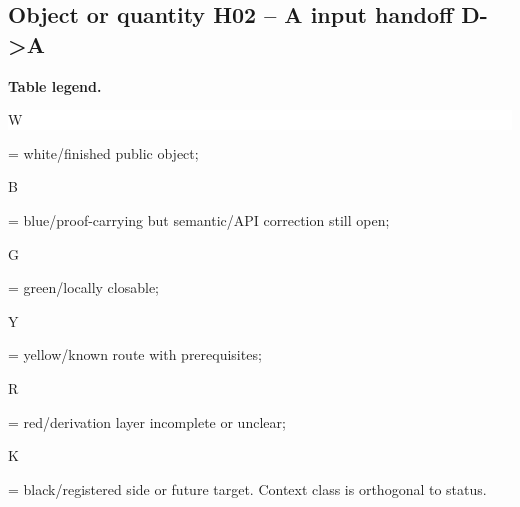 \subsection*{Object or quantity H02 -- A input handoff D->A}
\hypertarget{objproof:H02}{}
\par\smallskip\noindent\begin{minipage}{0.99\linewidth}\footnotesize\raggedright\textbf{Table legend.} \colorbox{white}{\strut W} = white/finished public object; \colorbox{cyan!20}{\strut B} = blue/proof-carrying but semantic/API correction still open; \colorbox{green!18}{\strut G} = green/locally closable; \colorbox{yellow!25}{\strut Y} = yellow/known route with prerequisites; \colorbox{red!20}{\strut R} = red/derivation layer incomplete or unclear; \colorbox{black!18}{\strut K} = black/registered side or future target. Context class is orthogonal to status.\end{minipage}\par\vspace{0.25em}
